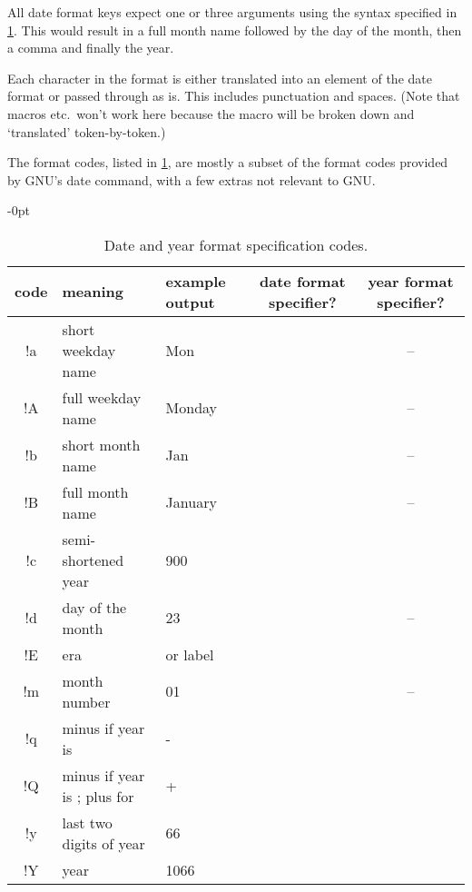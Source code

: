 \documentclass[10pt,british,a4paper]{ltxdoc}
\newcommand*{\fycheck}{\checkmark}
\newcommand*{\fycross}{--}
\newlength\tewadjust
\begin{document}
All date format keys expect one or three arguments using the syntax specified in \cref{tab:dyddiadau}.
This would result in a full month name followed by the day of the month, then a comma and finally the year.

Each character in the format is either translated into an element of the date format or passed through as is. 
This includes punctuation and spaces. 
(Note that macros etc.\ won't work here because the macro will be broken down and ‘translated’ token-by-token.)

The format codes, listed in \cref{tab:dyddiadau}, are mostly a subset of the format codes provided by GNU's date command, with a few extras not relevant to GNU.

\begin{table}
  \begin{adjustwidth}{-\tewadjust}{0pt}
    \centering
    \caption{Date and year format specification codes.}\label{tab:dyddiadau}
    \begin{tabular}{>{\ttfamily}cllcc}
      \toprule
      \sffamily code & \sffamily meaning & \sffamily example output & \sffamily date format specifier? & \sffamily year format specifier? \\\midrule
      !a  & short weekday name  &  Mon & \fycheck & \fycross \\
      !A  & full weekday name  &  Monday & \fycheck & \fycross \\
      !b  & short month name  &  Jan & \fycheck & \fycross \\
      !B  & full month name  &  January & \fycheck & \fycross \\
      !c  & semi-shortened year  &  900 & \fycheck & \fycheck \\
      !d  & day of the month  &  23 & \fycheck & \fycross \\
      !E  & era  &  \bceyearlabel{} or \ceyearlabel{} label & \fycheck & \fycheck \\
      !m  & month number  &  01 & \fycheck & \fycross \\
      !q  & minus if year is \bceyearlabel{} & - & \fycheck & \fycheck \\
      !Q  & minus if year is \bceyearlabel{}; plus for \ceyearlabel{} & + & \fycheck & \fycheck \\
      !y  & last two digits of year  &  66 & \fycheck & \fycheck \\
      !Y  & year  &  1066 & \fycheck & \fycheck \\
      \bottomrule
    \end{tabular}
  \end{adjustwidth}
\end{table}
\end{document}
